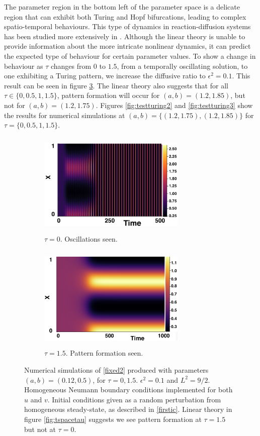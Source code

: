 The parameter region in the bottom left of the parameter space is a delicate region that can exhibit both Turing and Hopf bifurcations, leading to complex spatio-temporal behaviours. This type of dynamics in reaction-diffusion systems has been studied more extensively in \cite{krausefixed,jiang}. Although the linear theory is unable to provide information about the more intricate nonlinear dynamics, it can predict the expected type of behaviour for certain parameter values. To show a change in behaviour as $\tau$ changes from $0$ to $1.5$, from a temporally oscillating solution, to one exhibiting a Turing pattern, we increase the diffusive ratio to $\epsilon^2=0.1$. This result can be seen in figure \ref{fig:testturing}. The linear theory also suggests that for all $\tau\in\{0,0.5,1,1.5\}$, pattern formation will occur for $(a,b)=(1.2,1.85)$, but not for $(a,b)=(1.2,1.75)$. Figures \ref{fig:testturing2} and \ref{fig:testturing3} show the results for numerical simulations at $(a,b)=\{(1.2,1.75),(1.2,1.85)\}$ for $\tau=\{0,0.5,1,1.5\}$.
\begin{figure}[h]
    \centering
    \begin{subfigure}[b]{0.45\textwidth}
        \centering
        \includegraphics[width=7cm,height=5cm]{toscill.png}
        \caption{$\tau=0$. Oscillations seen.}
        \label{}
    \end{subfigure}
    \hfill
    \begin{subfigure}[b]{0.45\textwidth}
        \centering
        \includegraphics[width=7cm,height=5cm]{tpattpred.png}
        \caption{$\tau=1.5$. Pattern formation seen.}
        \label{}
    \end{subfigure}
    \caption{Numerical simulations of \eqref{fixed2} produced with parameters $(a,b)=(0.12,0.5)$, for $\tau=0,1.5$. $\epsilon^2=0.1$ and $L^2=9/2$. Homogeneous Neumann boundary conditions implemented for both $u$ and $v$. Initial conditions given as a random perturbation from homogeneous steady-state, as described in \eqref{firstic}. Linear theory in figure \ref{fig:tspacetau} suggests we see pattern formation at $\tau=1.5$ but not at $\tau=0$.}
    \label{fig:testturing}
\end{figure}

